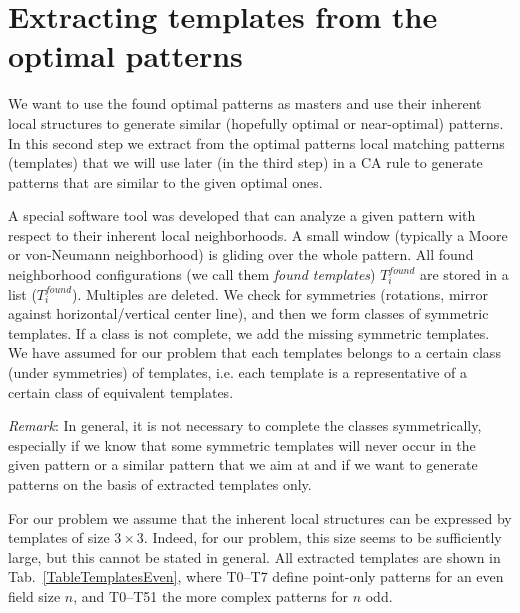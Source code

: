 \documentclass[10pt,a4paper]{article}  %
\begin{document}
\section{Extracting templates from the optimal patterns}

We want to use the found optimal patterns as masters and use their inherent local structures
to generate similar (hopefully optimal or near-optimal) patterns. 
In this second step we extract from the optimal patterns local matching patterns (templates) that we will
use later (in the third step) in a CA rule to generate patterns that are similar to the given optimal ones.

A special software tool was developed that can analyze a given pattern with respect to their inherent
local neighborhoods.
A small window (typically a Moore or von-Neumann neighborhood) is gliding over the whole pattern. 
All found neighborhood configurations (we call them \textit{found templates}) $T^{found}_i$ are stored in a list ($T^{found}_i$).
Multiples are deleted.
We check for symmetries (rotations, mirror against horizontal/vertical center line),
and then we form classes of symmetric templates. 
If a class is not complete, we add the missing symmetric templates.
We have assumed for our problem that each templates belongs to a certain class
(under symmetries) of templates, i.e. each template is a representative of a certain class
of equivalent templates. 

\textit{Remark}: In general, it is not necessary to complete the classes symmetrically, especially if we know
that some symmetric templates will never occur in the given pattern or a similar pattern that we
aim at and if we want to generate patterns on the basis of extracted templates only.

For our problem we assume that the inherent local structures can be expressed by templates of size $3 \times 3$.
Indeed, for our problem, this size seems to be sufficiently large, but this cannot be stated in general.
All extracted templates are shown in Tab.~\ref{TableTemplatesEven},
where T0--T7 define point-only patterns for an even field size $n$,
and T0--T51 the more complex patterns for $n$ odd.
\end{document}
